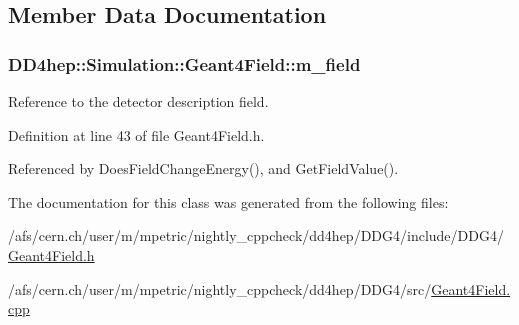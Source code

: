 \subsection{Member Data Documentation}
\hypertarget{class_d_d4hep_1_1_simulation_1_1_geant4_field_a453c3e707d5f019ef541b449c80100ae}{
\subsubsection[{m\_\-field}]{ {\bf DD4hep::Simulation::Geant4Field::m\_\-field}}}
\label{class_d_d4hep_1_1_simulation_1_1_geant4_field_a453c3e707d5f019ef541b449c80100ae}


Reference to the detector description field. 

Definition at line 43 of file Geant4Field.h.

Referenced by DoesFieldChangeEnergy(), and GetFieldValue().

The documentation for this class was generated from the following files:\begin{DoxyCompactItemize}
\item 
/afs/cern.ch/user/m/mpetric/nightly\_\-cppcheck/dd4hep/DDG4/include/DDG4/\hyperlink{_geant4_field_8h}{Geant4Field.h}\item 
/afs/cern.ch/user/m/mpetric/nightly\_\-cppcheck/dd4hep/DDG4/src/\hyperlink{_geant4_field_8cpp}{Geant4Field.cpp}\end{DoxyCompactItemize}
